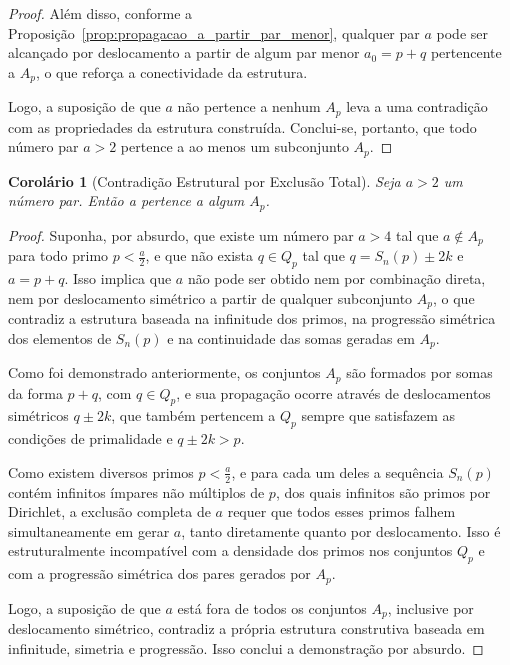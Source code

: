 \documentclass[a4paper,11pt]{article}
\newtheorem{corollary}[theorem]{Corolário}
\theoremstyle{definition}
\theoremstyle{remark}
\begin{document}
\begin{otherlanguage}{brazil}
\begin{proof}
		Além disso, conforme a Proposição~\ref{prop:propagacao_a_partir_par_menor}, qualquer par \(a\) pode ser alcançado por deslocamento a partir de algum par menor \(a_0 = p + q\) pertencente a \(A_p\), o que reforça a conectividade da estrutura.
		
		Logo, a suposição de que \(a\) não pertence a nenhum \(A_p\) leva a uma contradição com as propriedades da estrutura construída. Conclui-se, portanto, que todo número par \(a > 2\) pertence a ao menos um subconjunto \(A_p\).
	\end{proof}
	
	\begin{corollary}[Contradição Estrutural por Exclusão Total]\label{coro:contradicao_estrutural}
		Seja \(a > 2\) um número par. Então a pertence a algum \(A_p\).
	\end{corollary}
	
	\begin{proof}
		Suponha, por absurdo, que existe um número par \(a > 4\) tal que \(a \notin A_p\) para todo primo \(p < \frac{a}{2}\), e que não exista \(q \in Q_p\) tal que \(q = S_n(p) \pm 2k\) e \(a = p + q\). Isso implica que \(a\) não pode ser obtido nem por combinação direta, nem por deslocamento simétrico a partir de qualquer subconjunto \(A_p\), o que contradiz a estrutura baseada na infinitude dos primos, na progressão simétrica dos elementos de \(S_n(p)\) e na continuidade das somas geradas em \(A_p\).
		
		Como foi demonstrado anteriormente, os conjuntos \(A_p\) são formados por somas da forma \(p + q\), com \(q \in Q_p\), e sua propagação ocorre através de deslocamentos simétricos \(q \pm 2k\), que também pertencem a \(Q_p\) sempre que satisfazem as condições de primalidade e \(q \pm 2k > p\).
		
		Como existem diversos primos \(p < \frac{a}{2}\), e para cada um deles a sequência \(S_n(p)\) contém infinitos ímpares não múltiplos de \(p\), dos quais infinitos são primos por Dirichlet, a exclusão completa de \(a\) requer que todos esses primos falhem simultaneamente em gerar \(a\), tanto diretamente quanto por deslocamento. Isso é estruturalmente incompatível com a densidade dos primos nos conjuntos \(Q_p\) e com a progressão simétrica dos pares gerados por \(A_p\).
		
		Logo, a suposição de que \(a\) está fora de todos os conjuntos \(A_p\), inclusive por deslocamento simétrico, contradiz a própria estrutura construtiva baseada em infinitude, simetria e progressão. Isso conclui a demonstração por absurdo.
	\end{proof}
	

\end{otherlanguage}
\end{document}

